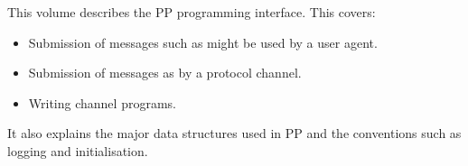 
\preface

This volume describes the PP programming interface. This covers:

\begin{itemize}
\item Submission of messages such as might be used by a user agent.
\item Submission of messages as by a protocol channel.
\item Writing channel programs.
\end{itemize}
It also explains the major data structures used in PP and the
conventions such as logging and initialisation.
